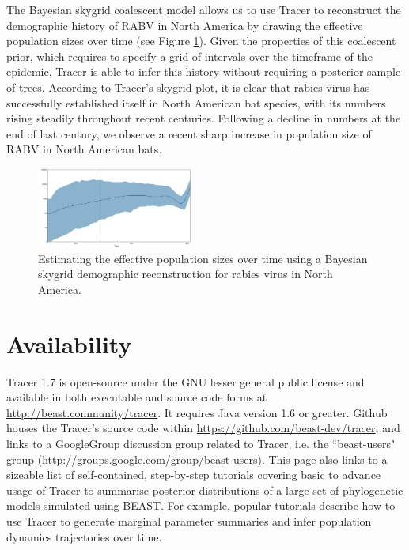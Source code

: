 \documentclass{bioinfo}
\begin{document}
The Bayesian skygrid coalescent model \citep{gill2012improving} allows us to use Tracer to reconstruct the demographic history of RABV in North America by drawing the effective population sizes over time (see Figure \ref{fig:rabv}).
Given the properties of this coalescent prior, which requires to specify a grid of intervals over the timeframe of the epidemic, Tracer is able to infer this history without requiring a posterior sample of trees.
According to Tracer's skygrid plot, it is clear that rabies virus has successfully established itself in North American bat species, with its numbers rising steadily throughout recent centuries.
Following a decline in numbers at the end of last century, we observe a recent sharp increase in population size of RABV in North American bats.


\begin{figure}[ht]
\centerline{
\includegraphics[width=0.46\textwidth]{./figures/rabv-skygrid.pdf}
}
\caption{Estimating the effective population sizes over time using a Bayesian skygrid demographic reconstruction for rabies virus in North America.}
\label{fig:rabv}
\end{figure}



\section*{Availability}

Tracer 1.7 is open-source under the GNU lesser general public license and available in both executable and source code forms at \url{http://beast.community/tracer}.
It requires Java version 1.6 or greater.
Github houses the Tracer's source code within \url{https://github.com/beast-dev/tracer}, and links to a GoogleGroup discussion group related to Tracer, i.e. the ``beast-users" group (\url{http://groups.google.com/group/beast-users}).
This page also links to a sizeable list of self-contained, step-by-step tutorials covering basic to advance usage of Tracer to summarise posterior distributions of a large set of phylogenetic models simulated using BEAST.  
For example, popular tutorials describe how to use Tracer to generate marginal parameter summaries and infer population dynamics trajectories over time.
\end{document}
